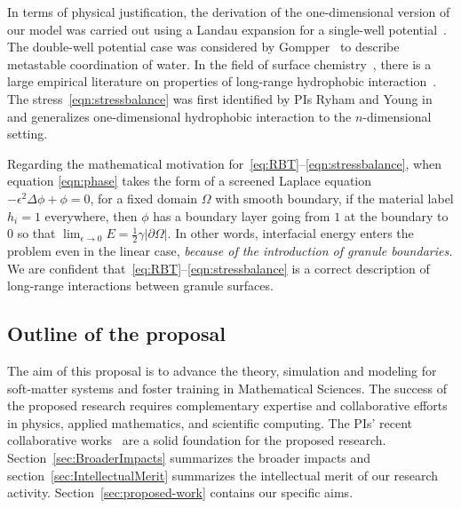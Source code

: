 In terms of physical justification, the derivation of the
one-dimensional version of our model was carried out using a Landau
expansion for a single-well potential~\cite{MaRa76, ErLjCl89}.
The double-well potential case was
considered by Gompper~\cite{GoHaKo94} to describe metastable
coordination of water. In the field of surface
chemistry~\cite{Israelachvili1954}, there is a large empirical
literature on properties of long-range hydrophobic
interaction~\cite{LeRaPa77, KoNa15, Nagle17, Lum1999, Lin2005,
Meyer2006, Ducker2016, Jackson2016, Gletal88, Aketal17, Ch05}. The
stress~\eqref{eqn:stressbalance} was first identified by PIs Ryham and
Young in~\cite{Fu2018_SIAM} and generalizes one-dimensional hydrophobic
interaction to the $n$-dimensional setting. 

Regarding the mathematical motivation for~\eqref{eq:RBT}--\eqref{eqn:stressbalance},
when equation \eqref{eqn:phase} takes the form of a screened Laplace equation
$-\epsilon^2 \Delta \phi + \phi =0$, for a fixed domain $\Omega$ with
smooth boundary, if the material label $h_i = 1$
everywhere, then $\phi$ has a boundary layer going from $1$ at the
boundary to $0$ so that 
$\lim_{\epsilon \to 0} E = \frac{1}{2}\gamma |\partial \Omega|$.
In other words, 
interfacial energy enters the problem even in the linear case,
\emph{because of the introduction of granule boundaries.}
We are confident
that~\eqref{eq:RBT}--\eqref{eqn:stressbalance} is a correct description
of long-range interactions between granule surfaces.


\subsection{Outline of the proposal}
The aim of this proposal is to advance the theory, simulation and
modeling for soft-matter systems and foster training in Mathematical
Sciences.
The success of the proposed research requires complementary expertise
and collaborative efforts in physics, applied mathematics, and
scientific computing. The PIs' recent collaborative
works~\cite{FuQuRyYo22, fu-ryh-qua-you2022}
are a solid foundation for the proposed research.
Section~\ref{sec:BroaderImpacts} summarizes the broader
impacts and section~\ref{sec:IntellectualMerit} summarizes the
intellectual merit of our research activity.
Section~\ref{sec:proposed-work} contains our specific aims.








